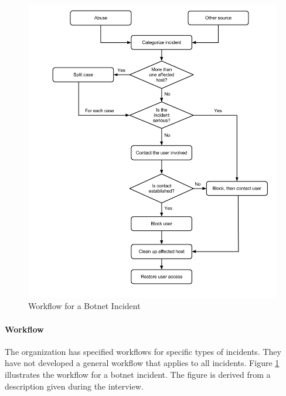 \documentclass[b5paper, twoside, openright, 11pt]{report}
\begin{document}
\begin{figure}[H]
\hspace{-1.1cm}\includegraphics[scale=0.53]{WorkflowCaseABotnet.png}
\caption[Workflow for a Botnet Incident, Case A]{Workflow for a Botnet Incident}
\label{fig:WorkflowCaseABotnet}
\end{figure}

\paragraph{Workflow}
The organization has specified workflows for specific types of incidents. They have not developed a general workflow that applies to all incidents. Figure \ref{fig:WorkflowCaseABotnet} illustrates the workflow for a botnet incident. The figure is derived from a description given during the interview. 
\end{document}
